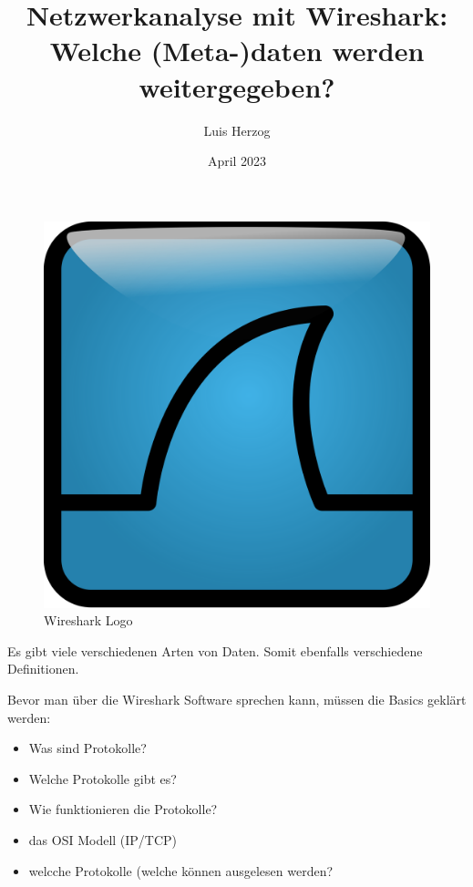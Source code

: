 \documentclass[12pt]{article}
\title{Netzwerkanalyse mit Wireshark: Welche (Meta-)daten werden weitergegeben?}
\author{Luis Herzog}
\date{April 2023}
\begin{document}

\maketitle


\thispagestyle{empty}

\begin{figure}[h]
	\centering
	\includegraphics[scale=0.1]{Bilder/Wireshark_icon.svg.png}
	\caption{Wireshark Logo}
	\label{fig:figure1}
\end{figure}


\newpage
\tableofcontents
\newpage

Es gibt viele verschiedenen Arten von Daten. Somit ebenfalls verschiedene Definitionen. 

Bevor man über die Wireshark Software sprechen kann, müssen die Basics geklärt werden:

\begin{itemize}
	\item Was sind Protokolle?
	\item Welche Protokolle gibt es?
	\item Wie funktionieren die Protokolle?
	\item das OSI Modell (IP/TCP)
	\item welcche Protokolle (welche können ausgelesen werden?
\end{itemize}
\end{document}
